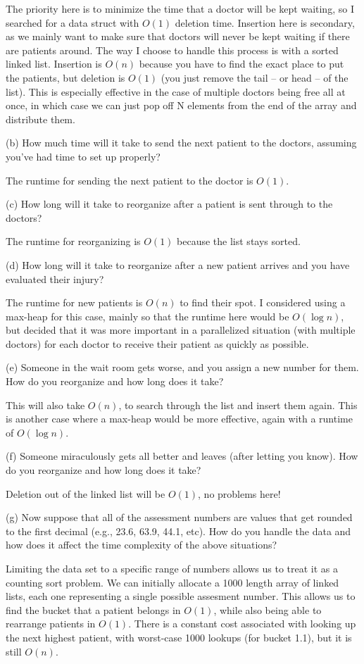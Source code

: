 \documentclass[12pt]{article}
\begin{document}
\begin{enumerate}
The priority here is to minimize the time that a doctor will be kept waiting, so I searched for a data struct with $O(1)$ deletion time.
Insertion here is secondary, as we mainly want to make sure that doctors will never be kept waiting if there are patients around.
The way I choose to handle this process is with a sorted linked list. Insertion is $O(n)$ because you have to find the exact place to
put the patients, but deletion is $O(1)$ (you just remove the tail -- or head -- of the list). This is especially effective in the case
of multiple doctors being free all at once, in which case we can just pop off N elements from the end of the array and distribute them.

(b) How much time will it take to send the next patient to the doctors, assuming you've had time to set up properly?

The runtime for sending the next patient to the doctor is $O(1)$.

(c) How long will it take  to reorganize after a patient is sent through to the doctors?

The runtime for reorganizing is $O(1)$ because the list stays sorted.

(d) How long will it take  to reorganize after a new patient arrives and you have evaluated their injury?

The runtime for new patients is $O(n)$ to find their spot. I considered using a max-heap for this case, mainly so that the runtime here would be $O(\log n)$,
but decided that it was more important in a parallelized situation (with multiple doctors) for each doctor to receive their patient as quickly as possible.

(e) Someone in the wait room gets worse, and you assign a new number for them. How do you reorganize and how long does it take?

This will also take $O(n)$, to search through the list and insert them again. This is another case where a max-heap would be more effective, again with a runtime of $O(\log n)$.

(f) Someone miraculously gets all better and leaves (after letting you know). How do you reorganize and how long does it take? 

Deletion out of the linked list will be $O(1)$, no problems here!

(g) Now suppose that all of the assessment numbers are values that get rounded to the first decimal (e.g., 23.6, 63.9, 44.1, etc). How do you handle the data and how does it affect the time complexity of the above situations?

Limiting the data set to a specific range of numbers allows us to treat it as a counting sort problem. We can initially allocate a 1000 length array of linked lists, 
each one representing a single possible assesment number. This allows us to find the bucket that a patient belongs in $O(1)$, while also being able to rearrange patients in $O(1)$.
There is a constant cost associated with looking up the next highest patient, with worst-case 1000 lookups (for bucket 1.1), but it is still $O(n)$.


\end{enumerate}
\end{document}
